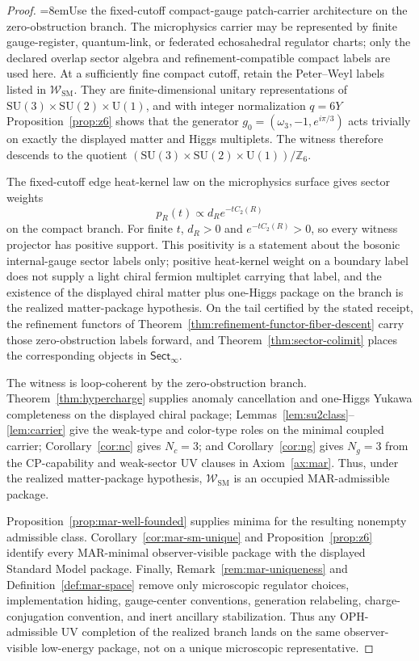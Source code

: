 \documentclass[11pt]{article}
\newcommand{\SU}{\mathrm{SU}}
\newcommand{\U}{\mathrm{U}}
\begin{document}
\begin{proof}
{\emergencystretch=8em\relax Use the fixed-cutoff compact-gauge patch-carrier architecture on the zero-obstruction branch. The
microphysics carrier may be represented by finite gauge-register, quantum-link, or federated
echosahedral regulator charts; only the declared overlap sector algebra and refinement-compatible
compact labels are used here. At a sufficiently fine compact cutoff, retain the Peter--Weyl labels
listed in \(\mathcal W_{\mathrm{SM}}\). They are finite-dimensional unitary representations of
\(\SU(3)\times\SU(2)\times\U(1)\), and with integer normalization \(q=6Y\)
Proposition~\ref{prop:z6} shows that the generator \(g_0=(\omega_3,-1,e^{i\pi/3})\) acts trivially
on exactly the displayed matter and Higgs multiplets. The witness therefore descends to the
quotient \((\SU(3)\times\SU(2)\times\U(1))/\mathbb Z_6\).\par}

The fixed-cutoff edge heat-kernel law on the microphysics surface gives sector weights
\[
p_R(t)\propto d_R e^{-tC_2(R)}
\]
on the compact branch. For finite \(t\), \(d_R>0\) and \(e^{-tC_2(R)}>0\), so every witness projector has positive support. This positivity is a statement about the bosonic internal-gauge sector labels only; positive heat-kernel weight on a boundary label does not supply a light chiral fermion multiplet carrying that label, and the existence of the displayed chiral matter plus one-Higgs package on the branch is the realized matter-package hypothesis. On the tail certified by the stated receipt, the refinement functors of Theorem~\ref{thm:refinement-functor-fiber-descent} carry those zero-obstruction labels forward, and Theorem~\ref{thm:sector-colimit} places the corresponding objects in \(\mathsf{Sect}_\infty\).

The witness is loop-coherent by the zero-obstruction branch. Theorem~\ref{thm:hypercharge} supplies anomaly cancellation and one-Higgs Yukawa completeness on the displayed chiral package; Lemmas~\ref{lem:su2class}--\ref{lem:carrier} give the weak-type and color-type roles on the minimal coupled carrier; Corollary~\ref{cor:nc} gives \(N_c=3\); and Corollary~\ref{cor:ng} gives \(N_g=3\) from the CP-capability and weak-sector UV clauses in Axiom~\ref{ax:mar}. Thus, under the realized matter-package hypothesis, \(\mathcal W_{\mathrm{SM}}\) is an occupied MAR-admissible package.

Proposition~\ref{prop:mar-well-founded} supplies minima for the resulting nonempty admissible class. Corollary~\ref{cor:mar-sm-unique} and Proposition~\ref{prop:z6} identify every MAR-minimal observer-visible package with the displayed Standard Model package. Finally, Remark~\ref{rem:mar-uniqueness} and Definition~\ref{def:mar-space} remove only microscopic regulator choices, implementation hiding, gauge-center conventions, generation relabeling, charge-conjugation convention, and inert ancillary stabilization. Thus any OPH-admissible UV completion of the realized branch lands on the same observer-visible low-energy package, not on a unique microscopic representative.
\end{proof}
\end{document}
